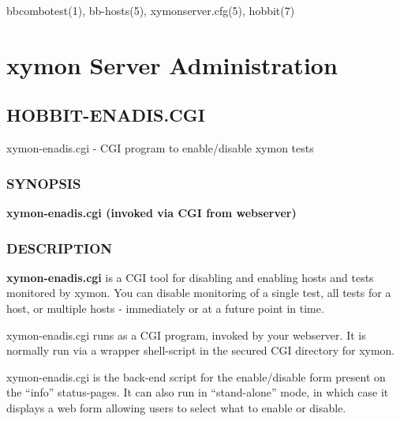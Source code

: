 bbcombotest(1), bb-hosts(5), xymonserver.cfg(5), hobbit(7) 
  


%
\chapter{xymon Server Administration}

%

\newpage
\section{HOBBIT-ENADIS.CGI}
 xymon-enadis.cgi - CGI program to enable/disable xymon tests \
\subsection{SYNOPSIS}
\textbf{xymon-enadis.cgi (invoked via CGI from webserver)}


 
\subsection{DESCRIPTION}
\textbf{xymon-enadis.cgi} is a CGI tool for disabling and enabling
hosts and tests monitored by xymon. You can disable monitoring of a
single test, all tests for a host, or multiple hosts - immediately or
at a future point in time. 


  xymon-enadis.cgi runs as a CGI program, invoked by your
  webserver. It is normally run via a wrapper shell-script in the
  secured CGI directory for xymon. 



  xymon-enadis.cgi is the back-end script for the enable/disable form
  present on the ``info'' status-pages. It can also run in
  ``stand-alone'' mode, in which case it displays a web form allowing
  users to select what to enable or disable. 



 


 
